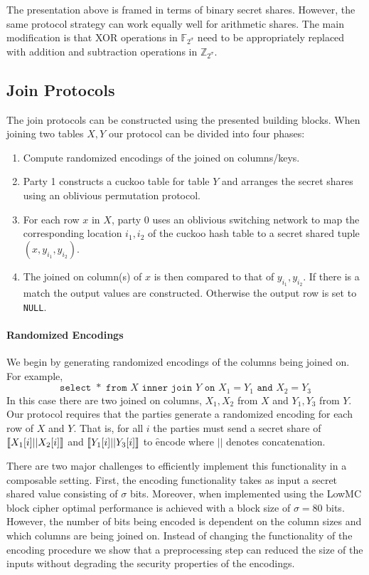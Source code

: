 The presentation above is framed in terms of binary secret shares. However, the same protocol strategy can work equally well for arithmetic shares. The main modification is that XOR operations in $\mathbb{F}_{2^\sigma}$ need to be appropriately replaced with addition and subtraction operations in $\mathbb{Z}_{2^\sigma}$. 


\subsection{Join Protocols}\label{sec:join}

The join protocols can be constructed using the presented building blocks. When joining two tables $X,Y$ our protocol can be divided into four phases:

\begin{enumerate}
	\item Compute randomized encodings of the joined on columns/keys. 
	\item Party 1 constructs a cuckoo table for table $Y$ and arranges the secret shares using an oblivious permutation protocol. 
	\item For each row $x$ in $X$, party 0 uses an oblivious switching network to map  the corresponding location $i_1,i_2$ of the cuckoo hash table to a secret shared tuple $(x, y_{i_1}, y_{i_2})$.
	\item The joined on column(s) of $x$ is then compared to that of $y_{i_1}, y_{i_2}$. If there is a match the output values are constructed. Otherwise the output row is set to \texttt{NULL}.
\end{enumerate} 

\paragraph{Randomized Encodings}
We begin by generating randomized encodings of the columns being joined on. For example, 
$$
	\texttt{select }* \texttt{ from } X \texttt{ inner join } Y \texttt{ on } X_1 = Y_1 \texttt{ and } X_2 = Y_3
$$
In this case there are two joined on columns, $X_1,X_2$ from $X$ and $Y_1,Y_3$ from $Y$. Our protocol requires that the parties generate a randomized encoding for each row of $X$ and $Y$. That is, for all $i$ the parties must send a secret share of $\llbracket X_1[i] || X_2[i]\rrbracket$ and $\llbracket Y_1[i] || Y_3[i]\rrbracket$ to \f{encode} where $||$ denotes concatenation. 

There are two major challenges to efficiently implement this functionality in a composable setting. First, the encoding functionality takes as input a secret shared value consisting of $\sigma$ bits. Moreover, when implemented using the LowMC block cipher optimal performance is achieved with a block size of $\sigma=80$ bits. However, the number of bits being encoded is dependent on the column sizes and which columns are being joined on. Instead of changing the functionality of the encoding procedure we show that a preprocessing step can reduced the size of the inputs without degrading the security properties of the encodings. 

